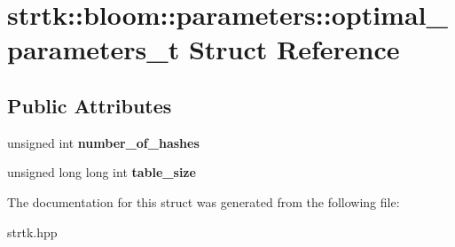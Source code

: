 \hypertarget{structstrtk_1_1bloom_1_1parameters_1_1optimal__parameters__t}{\section{strtk\-:\-:bloom\-:\-:parameters\-:\-:optimal\-\_\-parameters\-\_\-t Struct Reference}
\label{structstrtk_1_1bloom_1_1parameters_1_1optimal__parameters__t}
}
\subsection*{Public Attributes}
\begin{DoxyCompactItemize}
\item 
\hypertarget{structstrtk_1_1bloom_1_1parameters_1_1optimal__parameters__t_a7483cffcb450b54df36b89ba7c2d1cf6}{unsigned int {\bfseries number\-\_\-of\-\_\-hashes}}\label{structstrtk_1_1bloom_1_1parameters_1_1optimal__parameters__t_a7483cffcb450b54df36b89ba7c2d1cf6}

\item 
\hypertarget{structstrtk_1_1bloom_1_1parameters_1_1optimal__parameters__t_a95785ad23533fe59eaa3933263174d8a}{unsigned long long int {\bfseries table\-\_\-size}}\label{structstrtk_1_1bloom_1_1parameters_1_1optimal__parameters__t_a95785ad23533fe59eaa3933263174d8a}

\end{DoxyCompactItemize}


The documentation for this struct was generated from the following file\-:\begin{DoxyCompactItemize}
\item 
strtk.\-hpp\end{DoxyCompactItemize}

